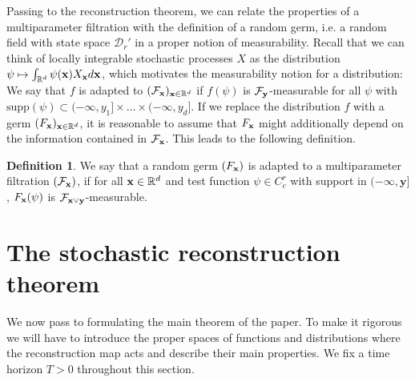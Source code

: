 \documentclass[12pt]{article}
\numberwithin{equation}{section}
\theoremstyle{plain}
\theoremstyle{definition}
\newtheorem{definition}[theorem]{Definition}
\def\bR{\mathbb{R}}\def\bS{\mathbb{S}}
\def\fy{\mathbf y}\def\fz{\mathbf z}
\def\supp{\mbox{supp}}
\begin{document}
 Passing to the reconstruction theorem, we can relate the properties of a multiparameter filtration with the definition of a random germ, i.e. a random field with state space $\mathcal{D}_r'$ in a proper notion of measurability. Recall that we can think of locally integrable stochastic processes $X$ as the distribution $\psi\mapsto \int_{\bR^d} \psi(\fx) X_\fx d\fx$, which motivates the measurability notion for a distribution: We say that $f$ is adapted to $(\cF_\fx)_{\fx\in\bR^d}$ if $f(\psi)$ is $\cF_\fy$-measurable for all $\psi$ with $\supp(\psi)\subset(-\infty,y_1]\times\dots\times(-\infty,y_d]$. If we replace the distribution $f$ with a germ $(F_\fx)_{\fx\in\bR^d}$, it is reasonable to assume that $F_\mathbf x$ might additionally depend on the information contained in $\mathcal{F}_\mathbf x$. This leads to the following definition. 


\begin{definition}\label{defn_adapted}
    We say that a random germ $(F_\mathbf x)$ is adapted to a multiparameter filtration $(\mathcal{F}_\mathbf x)$, if  for all $\fx\in\bR^d$ and test function $\psi\in C_c^r$ with support in $(-\infty,\fy]$, $F_\mathbf x(\psi)$ is $\cF_{\fx\vee\fy}$-measurable.
\end{definition}




\section{The stochastic reconstruction theorem}\label{sec:reconstruction}
We now pass to formulating the main theorem of the paper. To make it rigorous we will have to introduce  the proper spaces of functions and distributions where the reconstruction map acts and describe their main properties. We fix a time horizon $T>0$ throughout this section. 
\end{document}
